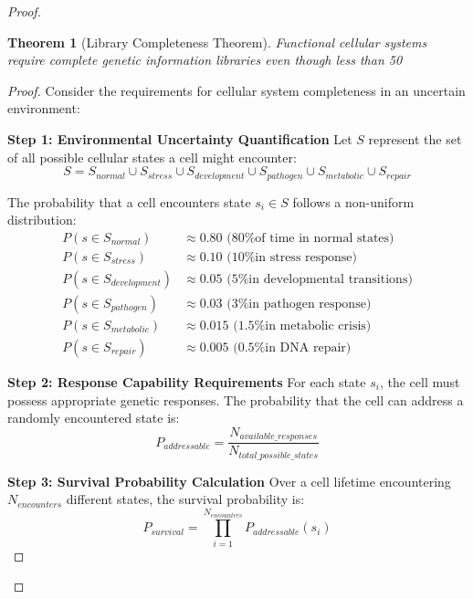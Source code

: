 \documentclass[12pt,a4paper]{article}
\newtheorem{theorem}{Theorem}[section]
\begin{document}
\begin{proof}
\begin{theorem}[Library Completeness Theorem]
Functional cellular systems require complete genetic information libraries even though less than 50%
\end{theorem}

\begin{proof}
Consider the requirements for cellular system completeness in an uncertain environment:

\textbf{Step 1: Environmental Uncertainty Quantification}
Let $S$ represent the set of all possible cellular states a cell might encounter:
\begin{equation}
S = S_{normal} \cup S_{stress} \cup S_{development} \cup S_{pathogen} \cup S_{metabolic} \cup S_{repair}
\end{equation}

The probability that a cell encounters state $s_i \in S$ follows a non-uniform distribution:
\begin{align}
P(s \in S_{normal}) &\approx 0.80 \text{ (80\% of time in normal states)} \\
P(s \in S_{stress}) &\approx 0.10 \text{ (10\% in stress response)} \\
P(s \in S_{development}) &\approx 0.05 \text{ (5\% in developmental transitions)} \\
P(s \in S_{pathogen}) &\approx 0.03 \text{ (3\% in pathogen response)} \\
P(s \in S_{metabolic}) &\approx 0.015 \text{ (1.5\% in metabolic crisis)} \\
P(s \in S_{repair}) &\approx 0.005 \text{ (0.5\% in DNA repair)}
\end{align}

\textbf{Step 2: Response Capability Requirements}
For each state $s_i$, the cell must possess appropriate genetic responses. The probability that the cell can address a randomly encountered state is:
\begin{equation}
P_{addressable} = \frac{N_{available\_responses}}{N_{total\_possible\_states}}
\end{equation}

\textbf{Step 3: Survival Probability Calculation}
Over a cell lifetime encountering $N_{encounters}$ different states, the survival probability is:
\begin{equation}
P_{survival} = \prod_{i=1}^{N_{encounters}} P_{addressable}(s_i)
\end{equation}


\end{proof}
\end{proof}
\end{document}
